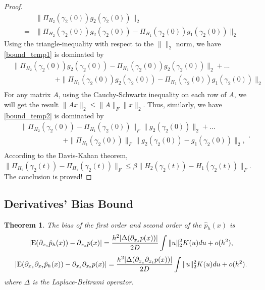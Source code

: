 \documentclass[aos,preprint]{imsart}
\newtheorem{theorem}{Theorem}[section]
\theoremstyle{remark}
\begin{document}
\begin{appendix}
\begin{proof}
\begin{equation}
\begin{aligned}
 &\|\Pi_{H_2}(\gamma_2(0))g_2(\gamma_2(0))\|_2\\
 =&  \|\Pi_{H_2}(\gamma_2(0))g_2(\gamma_2(0)) - \Pi_{H_1}(\gamma_2(0))g_1(\gamma_2(0))\|_2
 \end{aligned}
 \end{equation}
 Using the triangle-inequality with respect to the $\|\|_2$ norm, we have \eqref{bound_temp1} is dominated by
 \begin{equation}\label{bound_temp2}
 \begin{aligned}
& \|\Pi_{H_2}(\gamma_2(0))g_2(\gamma_2(0)) -\Pi_{H_1}(\gamma_2(0)){g_2}(\gamma_2(0)) \|_2 +...\\
 & \quad \quad  \quad \quad  \quad \quad + \|\Pi_{H_1}(\gamma_2(0)){g_2}(\gamma_2(0)) - \Pi_{H_1}(\gamma_2(0))g_1(\gamma_2(0))\|_2\\
 \end{aligned}
 \end{equation}
 For any matrix $A$, using the Cauchy-Schwartz inequality on each row of $A$, we will get the result $\|Ax\|_2\leq \|A\|_F\|x\|_2$. Thus, similarly, we have \eqref{bound_temp2} is dominated by
 \[
 \begin{aligned}
 & \|\Pi_{H_2}(\gamma_2(0)) - \Pi_{H_1}(\gamma_2(0))\|_F\|g_2(\gamma_2(0))\|_2 +...\\
 &\quad \quad  \quad \quad  \quad \quad  +\|\Pi_{H_1}(\gamma_2(0))\|_F\|g_2(\gamma_2(0))-g_1(\gamma_2(0))\|_2, \\
 \end{aligned}.
 \]
According to the Davis-Kahan theorem, $\|\Pi_{H_2}(\gamma_2(t))-\Pi_{H_1}(\gamma_2(t))\|_F \leq \beta\|H_2(\gamma_2(t))-H_1(\gamma_2(t))\|_F$. The conclusion is proved!
\end{proof}


\subsection{Derivatives' Bias Bound}\label{bias_proof}
\begin{theorem}
The bias of the first order and second order of the $\hat{p}_h(x)$ is 
\begin{equation*}\label{BiasResult}
|{\rm E}(\partial_{x_s}  \hat{p}_h(x)) - \partial_{x_s}p(x)|  = \frac{h^2|\Delta (\partial_{x_s}p(x))|}{2D}  \int \|u\|_2^2 K(u) du+o(h^2),
\end{equation*}
\begin{equation*}\label{order2}
|{\rm E}( \partial_{x_s} \partial_{x_t}  \hat{p}_h(x)) -  \partial_{x_s} \partial_{x_t} p(x)| = \frac{h^2 |\Delta (\partial_{x_s}\partial_{x_t} p(x))|}{2D} \int \|u\|_2^2 K(u) du+o(h^2).
\end{equation*}
where $\Delta$ is the Laplace-Beltrami operator.
\end{theorem}


\end{appendix}
\end{document}
